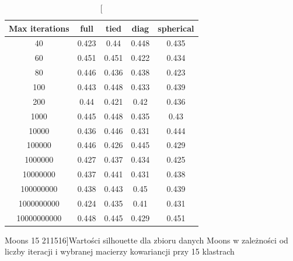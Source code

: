 \documentclass{classrep}
\begin{document}
{{            \begin{table}[!htbp]
                \begin{minipage}{1\textwidth}
                \centering
                \begin{tabular}{|c|c|c|c|c|}
                \hline
                Max iterations & full & tied & diag & spherical \\ \hline
                40 & 0.423 & 0.44 & 0.448 & 0.435 \\ \hline
                60 & 0.451 & 0.451 & 0.422 & 0.434 \\ \hline
                80 & 0.446 & 0.436 & 0.438 & 0.423 \\ \hline
                100 & 0.443 & 0.448 & 0.433 & 0.439 \\ \hline
                200 & 0.44 & 0.421 & 0.42 & 0.436 \\ \hline
                1000 & 0.445 & 0.448 & 0.435 & 0.43 \\ \hline
                10000 & 0.436 & 0.446 & 0.431 & 0.444 \\ \hline
                100000 & 0.446 & 0.426 & 0.445 & 0.429 \\ \hline
                1000000 & 0.427 & 0.437 & 0.434 & 0.425 \\ \hline
                10000000 & 0.437 & 0.441 & 0.431 & 0.438 \\ \hline
                100000000 & 0.438 & 0.443 & 0.45 & 0.439 \\ \hline
                1000000000 & 0.424 & 0.435 & 0.41 & 0.431 \\ \hline
                10000000000 & 0.448 & 0.445 & 0.429 & 0.451 \\ \hline
                \end{tabular}
                \caption
                [Moons 15 211516]{Wartości silhouette dla zbioru danych Moons w zależności od liczby iteracji i wybranej macierzy kowariancji przy 15 klastrach}
                \label{Moons_15_211516}
                \end{minipage}
                \hfill            
            

\end{table}}}
\end{document}
